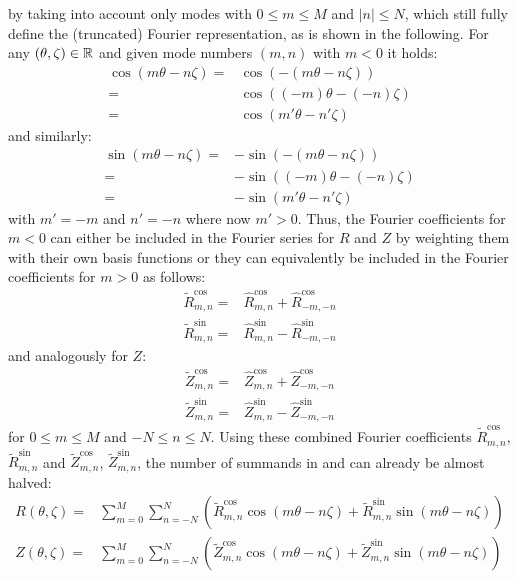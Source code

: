 by taking into account only modes with $0 \leq m \leq M$ and $|n| \leq N$,
which still fully define the (truncated) Fourier representation, as is shown in the following.
For any $(\theta, \zeta) \in \mathbb{R}$ and given mode numbers $(m,n)$ with $m < 0$ it holds:
\begin{align}
    \cos(m \theta - n \zeta)
 =& \cos\left(- ( m  \theta -   n  \zeta)\right) \nonumber \\
 =& \cos\left(  (-m) \theta - (-n) \zeta \right) \nonumber \\
 =& \cos\left(  m' \theta - n' \zeta \right)
\end{align}
and similarly:
\begin{align}
      \sin(m \theta - n \zeta)
 =& - \sin\left(- ( m  \theta -   n  \zeta)\right) \nonumber \\
 =& - \sin\left(  (-m) \theta - (-n) \zeta \right) \nonumber \\
 =& - \sin\left(  m' \theta - n' \zeta \right)
\end{align}
with $m' = -m$ and $n' = -n$ where now $m' > 0$.
Thus, the Fourier coefficients for $m<0$ can either be included in the Fourier series for $R$ and $Z$
by weighting them with their own basis functions
or they can equivalently be included in the Fourier coefficients for $m>0$ as follows:
\begin{align}
 \tilde{R}_{m,n}^\mathrm{cos} =& \hat{R}_{m,n}^\mathrm{cos} + \hat{R}_{-m,-n}^\mathrm{cos} \\
 \tilde{R}_{m,n}^\mathrm{sin} =& \hat{R}_{m,n}^\mathrm{sin} - \hat{R}_{-m,-n}^\mathrm{sin}
\end{align}
and analogously for $Z$:
\begin{align}
 \tilde{Z}_{m,n}^\mathrm{cos} =& \hat{Z}_{m,n}^\mathrm{cos} + \hat{Z}_{-m,-n}^\mathrm{cos} \\
 \tilde{Z}_{m,n}^\mathrm{sin} =& \hat{Z}_{m,n}^\mathrm{sin} - \hat{Z}_{-m,-n}^\mathrm{sin}
\end{align}
for $0 \leq m \leq M$ and $-N \leq n \leq N$.
Using these combined Fourier coefficients
    $\tilde{R}_{m,n}^\mathrm{cos}$, $\tilde{R}_{m,n}^\mathrm{sin}$
and $\tilde{Z}_{m,n}^\mathrm{cos}$, $\tilde{Z}_{m,n}^\mathrm{sin}$,
the number of summands in  and  can already be almost halved:
\begin{align}
  R(\theta, \zeta) =& \sum_{m=0}^{M} \sum_{n=-N}^{N}
                       \left( \tilde{R}_{m,n}^\mathrm{cos} \cos(m \theta - n \zeta) + \tilde{R}_{m,n}^\mathrm{sin} \sin(m \theta - n \zeta) \right) \nonumber \\
  Z(\theta, \zeta) =& \sum_{m=0}^{M} \sum_{n=-N}^{N}
                       \left( \tilde{Z}_{m,n}^\mathrm{cos} \cos(m \theta - n \zeta) + \tilde{Z}_{m,n}^\mathrm{sin} \sin(m \theta - n \zeta) \right) \nonumber
\end{align}
